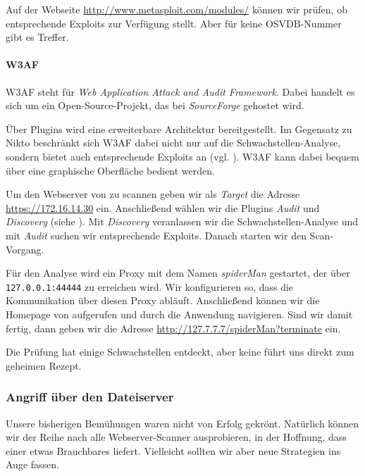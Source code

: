 
Auf der Webseite \url{http://www.metasploit.com/modules/} können wir prüfen, ob
\Metasploit{} entsprechende Exploits zur Verfügung stellt. Aber für keine
OSVDB-Nummer gibt es Treffer.
    
\paragraph{W3AF}

W3AF steht für \emph{Web Application Attack and Audit Framework}. Dabei handelt
es sich um ein Open-Source-Projekt, das bei \emph{SourceForge} gehostet wird.

Über Plugins wird eine erweiterbare Architektur bereitgestellt. Im Gegensatz zu
Nikto beschränkt sich W3AF dabei nicht nur auf die Schwachstellen-Analyse,
sondern bietet auch entsprechende Exploits an (vgl. \cite{W3AF}). W3AF kann
dabei bequem über eine graphische Oberfläche bedient werden.

Um den Webserver von \Mayerbrot{} zu scannen geben wir als \emph{Target} die
Adresse \url{https://172.16.14.30} ein. Anschließend wählen wir die Plugins
\emph{Audit} und \emph{Discovery} (siehe ). Mit \emph{Discovery}
veranlassen wir die Schwachstellen-Analyse und mit \emph{Audit} suchen wir
entsprechende Exploits. Danach starten wir den Scan-Vorgang.


Für den Analyse wird ein Proxy mit dem Namen \emph{spiderMan} gestartet, der
über \texttt{127.0.0.1:44444} zu erreichen wird. Wir konfigurieren \Firefox{}
so, dass die Kommunikation über diesen Proxy abläuft. Anschließend können wir
die Homepage von \Mayerbrot{} aufgerufen und durch die Anwendung
navigieren. Sind wir damit fertig, dann geben wir die Adresse
\url{http://127.7.7.7/spiderMan?terminate} ein.

Die Prüfung hat einige Schwachstellen entdeckt, aber keine führt uns direkt zum
geheimen Rezept.


\subsubsection{Angriff über den Dateiserver}

Unsere bisherigen Bemühungen waren nicht von Erfolg gekrönt. Natürlich können
wir der Reihe nach alle Webserver-Scanner ausprobieren, in der Hoffnung, dass
einer etwas Brauchbares liefert. Vielleicht sollten wir aber neue Strategien ins
Auge fassen.

